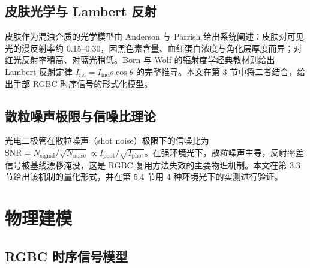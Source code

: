 \documentclass[11pt,a4paper]{ctexart}
\begin{document}
\subsection{皮肤光学与 Lambert 反射}
皮肤作为混浊介质的光学模型由 Anderson 与 Parrish\citep{andersonparrish1981} 给出系统阐述：皮肤对可见光的漫反射率约 0.15--0.30，因黑色素含量、血红蛋白浓度与角化层厚度而异；对红光反射率稍高、对蓝光稍低。Born 与 Wolf\citep{bornwolf1999} 的辐射度学经典教材则给出 Lambert 反射定律 $I_{\mathrm{ref}}=I_{\mathrm{inc}}\rho\cos\theta$ 的完整推导。本文在第 3 节中将二者结合，给出手部 RGBC 时序信号的形式化模型。

\subsection{散粒噪声极限与信噪比理论}
光电二极管在散粒噪声（shot noise）极限下的信噪比为 $\mathrm{SNR}=N_{\mathrm{signal}}/\sqrt{N_{\mathrm{noise}}}\propto I_{\mathrm{phot}}/\sqrt{I_{\mathrm{phot}}}$。在强环境光下，散粒噪声主导，反射率差信号被基线漂移淹没，这是 RGBC 复用方法失效的主要物理机制。本文在第 3.3 节给出该机制的量化形式，并在第 5.4 节用 4 种环境光下的实测进行验证。

\section{物理建模}
\label{sec:model}

\subsection{RGBC 时序信号模型}
\label{sec:model_signal}
\end{document}
